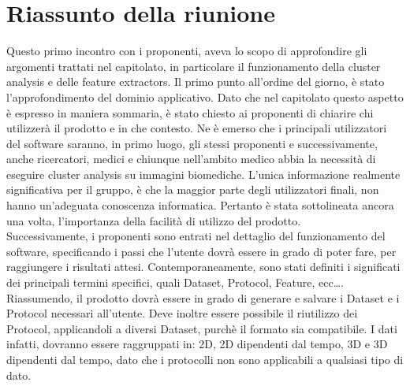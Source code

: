 \section{Riassunto della riunione}
\label{riassunto}
Questo primo incontro con i proponenti, aveva lo scopo di approfondire gli argomenti trattati nel capitolato, 
in particolare il funzionamento della cluster analysis\glossario{} e delle 
feature extractors\glossario{}.
Il primo punto all'ordine del giorno, è stato l'approfondimento del dominio applicativo. Dato che nel capitolato questo aspetto è espresso in maniera sommaria, è stato chiesto ai proponenti di chiarire chi utilizzerà il 
prodotto e in che contesto. Ne è emerso che i principali utilizzatori del software saranno, in primo luogo, gli
stessi proponenti e successivamente, anche ricercatori, medici e chiunque nell'ambito medico abbia la necessità di 
eseguire cluster analysis\glossario{} su immagini biomediche. L'unica informazione realmente 
significativa per il gruppo, è che la maggior parte degli utilizzatori finali, non hanno un'adeguata conoscenza informatica. Pertanto è stata sottolineata ancora una volta, l'importanza della facilità di utilizzo del prodotto.
\\Successivamente, i proponenti sono entrati nel dettaglio del funzionamento del software, specificando i passi 
che l'utente dovrà essere in grado di poter fare, per raggiungere i risultati attesi. Contemporaneamente, sono stati definiti i significati dei principali termini specifici, quali Dataset\glossario{}, Protocol\glossario, Feature\glossario, ecc\dots.
Riassumendo, il prodotto dovrà essere in grado di generare e salvare i Dataset\glossario{} e i Protocol\glossario{} necessari all'utente. Deve inoltre essere possibile il riutilizzo dei Protocol\glossario{}, applicandoli a diversi Dataset\glossario{}, purchè il formato sia compatibile. I dati infatti, dovranno essere raggruppati in: 2D, 2D dipendenti dal tempo, 3D e 3D dipendenti dal tempo, dato che i protocolli non sono applicabili a qualsiasi tipo di dato.
